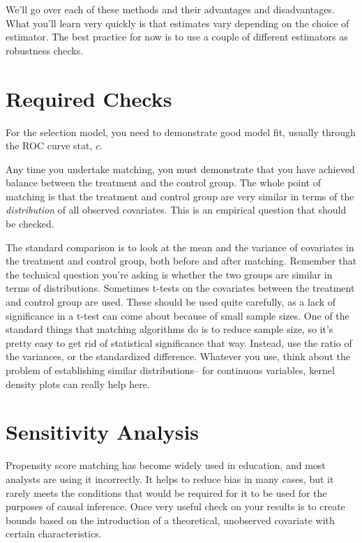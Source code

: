 \documentclass[12pt]{article}
\begin{document}
We'll go over each of these methods and their advantages and
disadvantages. What you'll learn very quickly is that estimates vary
depending on the choice of estimator. The best practice for now is to
use a couple of different estimators as robustness checks. 

\section{Required Checks}
\label{sec:required-checks}

For the selection model, you need to demonstrate good model fit,
usually through the ROC curve stat, $c$. 

Any time you undertake matching, you must demonstrate that you have
achieved balance between the treatment and the control group. The
whole point of matching is that the treatment and control group are
very similar in terms of the \textit{distribution} of all observed covariates. This is an
empirical question that should be checked.

The standard comparison is to look at the mean and the variance of
covariates in the treatment and control group, both before and after
matching. Remember that the technical question you're asking is
whether the two groups are similar in terms of
distributions. Sometimes t-tests on the covariates between the
treatment and control group are used. These should be used quite
carefully, as a lack of significance in a t-test can come about
because of small sample sizes. One of the standard things that
matching algorithms do is to reduce sample size, so it's pretty easy
to get rid of statistical significance that way. Instead, use the
ratio of the variances, or the standardized difference. Whatever you
use, think about the problem of establishing similar distributions--
for continuous variables, kernel density plots can really help here. 


\section{Sensitivity  Analysis}

Propensity score matching has become widely used in education, and
most analysts are using it incorrectly. It  helps to reduce bias in
many cases, but it rarely meets the conditions that would be required
for it to be used for the purposes of causal inference. Once very
useful check on your results is to create bounds based on the
introduction of a theoretical, unobserved covariate with certain
characteristics. 
\end{document}
